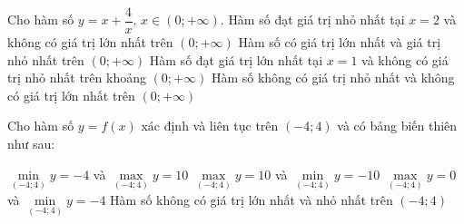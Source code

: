 \begin{ex}%
	Cho hàm số  $y=x+\dfrac{4}{x},\, x\in \left(0;+\infty \right)$.
	 \choiceTF
		{\True  Hàm số đạt giá trị nhỏ nhất tại $x=2$ và không có giá trị lớn nhất trên $\left(0;+\infty \right)$}
		{Hàm số có giá trị lớn nhất và giá  trị nhỏ nhất trên $\left(0;+\infty \right)$}
		{Hàm số đạt giá  trị lớn nhất tại $x=1$ và không có giá trị nhỏ nhất trên khoảng $\left(0;+\infty \right)$}
		{Hàm số không có giá trị  nhỏ nhất và không có giá trị lớn nhất trên $\left(0;+\infty \right)$}
\end{ex}

\begin{ex}%
	Cho hàm số $y=f(x)$ xác định và liên tục trên $\left(-4;4\right)$ và có bảng biến  thiên như sau:
	\begin{center}
	\end{center}
	 \choiceTF
		{${\mathop{\min}\limits_{\left(-4;4\right)}} y=-4$  và ${\mathop{\max}\limits_{\left(-4;4\right)}} y=10$}
		{${\mathop{\max}\limits_{\left(-4;4\right)}}  y=10$ và ${\mathop{\min}\limits_{\left(-4;4\right)}} y=-10$}
		 {${\mathop{\max}\limits_{\left(-4;4\right)}} y=0$ và ${\mathop{\min}\limits_{\left(-4;4\right)}} y=-4$}
		{\True Hàm số không có giá trị lớn nhất và nhỏ nhất trên  $\left(-4;4\right)$}
\end{ex}


